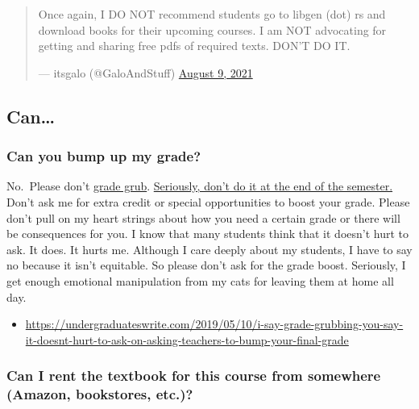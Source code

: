 \begin{quote}
Once again, I DO NOT recommend students go to libgen (dot) rs and
download books for their upcoming courses. I am NOT advocating for
getting and sharing free pdfs of required texts. DON'T DO IT.

\begin{flushright}--- itsgalo (@GaloAndStuff) \href{https://twitter.com/GaloAndStuff/status/1424818560417902604}{August 9,
2021}\end{flushright}
\end{quote}

\hypertarget{can}{%
\subsection{Can\ldots{}}\label{can}}

\hypertarget{can-you-bump-up-my-grade}{%
\subsubsection{Can you bump up my grade?}\label{can-you-bump-up-my-grade}}

No.~Please don't \href{https://undergraduateswrite.com/2019/05/10/i-say-grade-grubbing-you-say-it-doesnt-hurt-to-ask-on-asking-teachers-to-bump-your-final-grade/}{grade grub}. \href{https://undergraduateswrite.com/2019/05/10/i-say-grade-grubbing-you-say-it-doesnt-hurt-to-ask-on-asking-teachers-to-bump-your-final-grade/}{Seriously, don't do it at the end of the semester.} Don't ask me for extra credit or special opportunities to boost your grade. Please don't pull on my heart strings about how you need a certain grade or there will be consequences for you. I know that many students think that it doesn't hurt to ask. It does. It hurts me. Although I care deeply about my students, I have to say no because it isn't equitable. So please don't ask for the grade boost. Seriously, I get enough emotional manipulation from my cats for leaving them at home all day.

\begin{itemize}
\tightlist
\item
  \url{https://undergraduateswrite.com/2019/05/10/i-say-grade-grubbing-you-say-it-doesnt-hurt-to-ask-on-asking-teachers-to-bump-your-final-grade}
\end{itemize}

\hypertarget{can-i-rent-the-textbook-for-this-course-from-somewhere-amazon-bookstores-etc.}{%
\subsubsection{Can I rent the textbook for this course from somewhere (Amazon, bookstores, etc.)?}\label{can-i-rent-the-textbook-for-this-course-from-somewhere-amazon-bookstores-etc.}}

